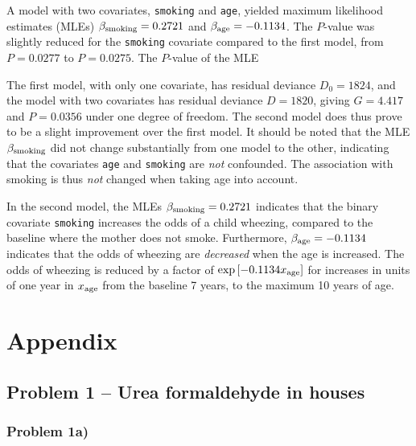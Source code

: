 \documentclass[a4paper,11pt]{article}
\begin{document}
\begin{enumerate}[label=3\alph*)]
        A model with two covariates, \texttt{smoking} and \texttt{age}, yielded maximum likelihood estimates (MLEs) $\beta_{\rm smoking} = 0.2721$ and $\beta_{\rm age} = -0.1134$. The $P$-value was slightly reduced for the \texttt{smoking} covariate compared to the first model, from $P = 0.0277$ to $P= 0.0275$. The $P$-value of the MLE 

        The first model, with only one covariate, has residual deviance $D_0 = 1824$, and the model with two covariates has residual deviance $D = 1820$, giving $G = 4.417$ and $P = 0.0356$ under one degree of freedom. The second model does thus prove to be a slight improvement over the first model. It should be noted that the MLE $\beta_{\rm smoking}$ did not change substantially from one model to the other, indicating that the covariates \texttt{age} and \texttt{smoking} are \textit{not} confounded. The association with smoking is thus \textit{not} changed when taking age into account.

        In the second model, the MLEs $\beta_{\rm smoking} = 0.2721$ indicates that the binary covariate \texttt{smoking} increases the odds of a child wheezing, compared to the baseline where the mother does not smoke. Furthermore, $\beta_{\rm age} = -0.1134$ indicates that the odds of wheezing are \textit{decreased} when the age is increased. The odds of wheezing is reduced by a factor of $\exp\left[ -0.1134 x_{\rm age} \right]$ for increases in units of one year in $x_{\rm age}$ from the baseline 7 years, to the maximum 10 years of age. 

\end{enumerate}



%
%

\clearpage
\appendix
\section{Appendix}
\label{sec:appendix}

\subsection{Problem 1 -- Urea formaldehyde in houses}
\subsubsection{Problem 1a)}
\label{app:1a}
\end{document}
